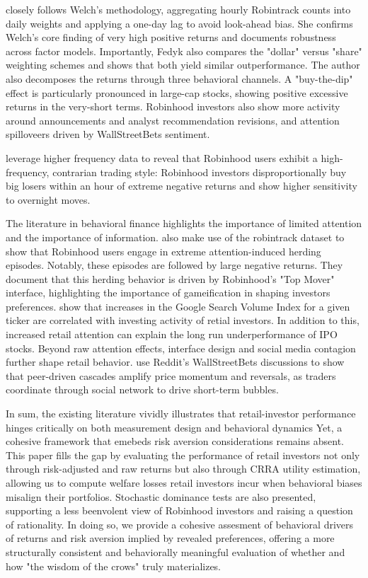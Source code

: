 \cite{Fedyk2024} closely follows Welch's methodology, aggregating hourly Robintrack counts into daily weights and applying a one-day lag to avoid look-ahead bias. 
She confirms Welch's core finding of very high positive returns and documents robustness across factor models. 
Importantly, Fedyk also compares the "dollar" versus "share" weighting schemes and shows that both yield similar outperformance.
The author also decomposes the returns through three behavioral channels.
A "buy-the-dip" effect is particularly pronounced in large-cap stocks, showing positive excessive returns in the very-short terms.
Robinhood investors also show more activity around announcements and analyst recommendation revisions,
and attention spilloveers driven by WallStreetBets sentiment. 

\cite{ardia2023fastfurioushighfrequencyanalysis} leverage higher frequency data to reveal that Robinhood users exhibit a high-frequency, contrarian trading style:
Robinhood investors disproportionally buy big losers within an hour of extreme negative returns and show higher sensitivity to overnight moves.

The literature in behavioral finance highlights the importance of limited attention and the importance of information.
\cite{barber2021robinhood} also make use of the robintrack dataset to show that Robinhood users engage in extreme attention-induced herding episodes.
Notably, these episodes are followed by large negative returns.
They document that this herding behavior is driven by Robinhood's "Top Mover" interface, highlighting the importance of gameification in shaping investors preferences. 
\cite{zhi2009} show that increases in the Google Search Volume Index for a given ticker are correlated with investing activity of retial investors.
In addition to this, increased retail attention can explain the long run underperformance of IPO stocks.
Beyond raw attention effects, interface design and social media contagion further shape retail behavior.
\cite{semenova2023socialcontagionassetprices} use Reddit's WallStreetBets discussions to show that peer-driven cascades amplify price momentum and reversals,
as traders coordinate through social network to drive short-term bubbles.

In sum, the existing literature vividly illustrates that retail-investor performance hinges critically on both measurement design and behavioral dynamics
Yet, a cohesive framework that emebeds risk aversion considerations remains absent.
This paper fills the gap by evaluating the performance of retail investors not only through risk-adjusted and raw returns but also 
through CRRA utility estimation, allowing us to compute welfare losses retail investors incur when behavioral biases misalign their portfolios.
Stochastic dominance tests are also presented, supporting a less beenvolent view of Robinhood investors and raising a question of rationality.
In doing so, we provide a cohesive assesment of behavioral drivers of returns and risk aversion implied by revealed preferences,
offering a more structurally consistent and behaviorally meaningful evaluation of whether and how "the wisdom of the crows" truly materializes.